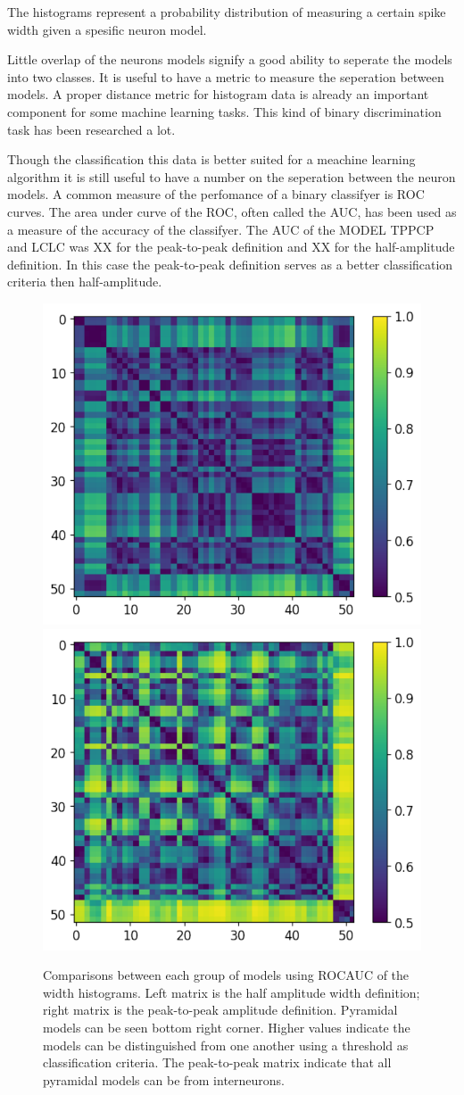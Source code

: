\documentclass[altfont, fleqn]{uiophd}
\begin{document}
The histograms represent a probability distribution of
measuring a certain spike width given a spesific neuron
model. 

Little overlap of the neurons models signify
a good ability to seperate the models into two classes. 
It is useful to have a metric to measure the seperation 
between models.
A proper distance metric for histogram data is already 
an important component for some machine learning tasks. 
This kind of binary discrimination task has been researched
a lot.

Though the classification this data is better suited for a
meachine learning algorithm 
it is still useful to have a number on the seperation 
between the neuron models. 
A common measure of the perfomance of a binary classifyer
is ROC curves. 
The area under curve of the ROC, often called the AUC, 
has been used as a measure 
of the accuracy of the classifyer. 
The AUC of the MODEL TPPCP and LCLC was XX for
the peak-to-peak definition and XX for the half-amplitude 
definition. 
In this case the peak-to-peak definition serves as a better
classification criteria then half-amplitude.
\newline

\begin{figure}[h]
    \begin{center}
        \includegraphics[width=.45\linewidth]{images/sec_4/roc_width_II_meaned.pdf}
        \includegraphics[width=.45\linewidth]{images/sec_4/roc_width_I_meaned.pdf}
        \caption{
            Comparisons between each group of models using ROCAUC
            of the width histograms. 
            Left matrix is the half amplitude width definition; 
            right matrix is the peak-to-peak amplitude definition.
            Pyramidal models can be seen bottom right corner. 
            Higher values indicate the models can be distinguished from one
            another using a threshold as classification criteria. 
            The peak-to-peak matrix indicate that all pyramidal models can be 
            from interneurons. 
        }
        \label{fig:4_roc_width_I_II}
    \end{center}
\end{figure}
\end{document}
